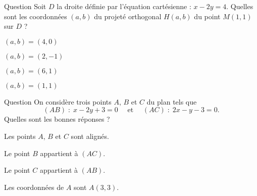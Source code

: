 \begin{multi}[multiple,feedback=
{Le vecteur \(\vec{u}=(1,-2)\) est normal à \(D\) et le vecteur \(\vec{v}=(2,1)\) est directeur de \(D\). Les coordonnées de \(H\) vérifient le système
\[\left\{\begin{array}{l}a-2b=4\\ \overrightarrow{HM}\cdot\vec{v}=0
\end{array}\right. \Leftrightarrow \left\{\begin{array}{l}a-2b=4\\ 2a+b=3
\end{array}\right. \Leftrightarrow \left\{\begin{array}{l}a=2\\ b=-1.
\end{array}\right.\]
}]{Question}
Soit \(D\) la droite définie par l'équation cartésienne : \(x-2y=4\). Quelles sont les coordonnées \((a,b)\) du projeté orthogonal \(H(a,b)\) du point \(M(1,1)\) sur \(D\) ?

    \item \((a,b)=(4,0)\)
    \item* \((a,b)=(2,-1)\)
    \item \((a,b)=(6,1)\)
    \item \((a,b)=(1,1)\)
\end{multi}


\begin{multi}[multiple,feedback=
{Les points \(A\), \(B\) et \(C\) ne sont pas alignés car sinon les droites \((AB)\) et \((AC)\) seraient confondues. Ces droites se coupent en \(A\) et les coordonnées de ce point d'intersection vérifient le système 
\[\left\{\begin{array}{l}x-2y+3=0\\ 2x-y-3=0
\end{array}\right. \Leftrightarrow \left\{\begin{array}{l}x=3\\ y=3.\end{array}\right.\]
}]{Question}
On considère trois points \(A\), \(B\) et \(C\) du plan tels que
\[(AB)\; : \; x-2y+3=0\quad \mbox{ et }\quad (AC)\; : \; 2x-y-3=0.\]
Quelles sont les bonnes réponses ?

    \item Les points \(A\), \(B\) et \(C\) sont alignés.
    \item Le point \(B\) appartient à \((AC)\).
    \item Le point \(C\) appartient à \((AB)\).
    \item* Les coordonnées de \(A\) sont \(A(3,3)\).
\end{multi}


